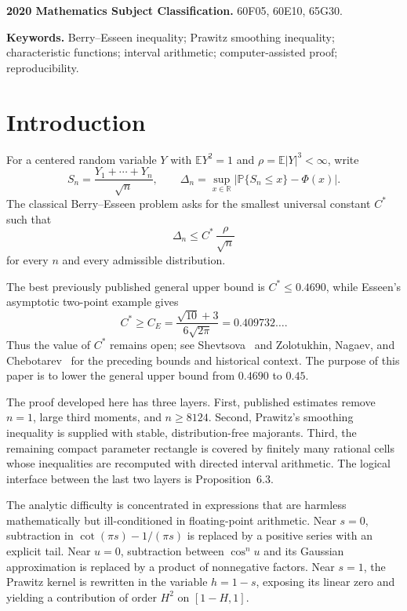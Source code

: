 \documentclass[11pt,a4paper,twoside]{article}
\theoremstyle{remark}
\newcommand{\R}{\mathbb{R}}
\newcommand{\E}{\mathbb{E}}
\newcommand{\Prob}{\mathbb{P}}
\newcommand{\abs}[1]{\lvert#1\rvert}
\newcommand{\Cstar}{C^{\ast}}
\begin{document}
\noindent\textbf{2020 Mathematics Subject Classification.}
60F05, 60E10, 65G30.

\noindent\textbf{Keywords.}
Berry--Esseen inequality; Prawitz smoothing inequality; characteristic
functions; interval arithmetic; computer-assisted proof; reproducibility.

\section{Introduction}

For a centered random variable \(Y\) with
\(\E Y^2=1\) and \(\rho=\E\abs{Y}^3<\infty\), write
\[
 S_n=\frac{Y_1+\cdots+Y_n}{\sqrt n},
 \qquad
 \Delta_n=\sup_{x\in\R}\abs{\Prob\{S_n\le x\}-\Phi(x)}.
\]
The classical Berry--Esseen problem asks for the smallest universal constant
\(\Cstar\) such that
\[
 \Delta_n\le \Cstar\,\frac{\rho}{\sqrt n}
\]
for every \(n\) and every admissible distribution.

The best previously published general upper bound is
\(\Cstar\le0.4690\), while Esseen's asymptotic two-point example gives
\[
 \Cstar\ge
 C_E=\frac{\sqrt{10}+3}{6\sqrt{2\pi}}
 =0.409732\ldots.
\]
Thus the value of \(\Cstar\) remains open; see
Shevtsova~\cite{Shevtsova2013} and
Zolotukhin, Nagaev, and Chebotarev~\cite{ZolotukhinNagaevChebotarev2018}
for the preceding bounds and historical context.  The purpose of this paper
is to lower the general upper bound from \(0.4690\) to \(0.45\).

The proof developed here has three layers.  First, published estimates remove
\(n=1\), large third moments, and \(n\ge8124\).  Second, Prawitz's smoothing
inequality is supplied with stable, distribution-free majorants.  Third, the
remaining compact parameter rectangle is covered by finitely many rational
cells whose inequalities are recomputed with directed interval arithmetic.
The logical interface between the last two layers is Proposition~6.3.

The analytic difficulty is concentrated in expressions that are harmless
mathematically but ill-conditioned in floating-point arithmetic.  Near
\(s=0\), subtraction in
\(\cot(\pi s)-1/(\pi s)\) is replaced by a positive series with an explicit
tail.  Near \(u=0\), subtraction between \(\cos^n u\) and its Gaussian
approximation is replaced by a product of nonnegative factors.  Near \(s=1\),
the Prawitz kernel is rewritten in the variable \(h=1-s\), exposing its
linear zero and yielding a contribution of order \(H^2\) on
\([1-H,1]\).
\end{document}
